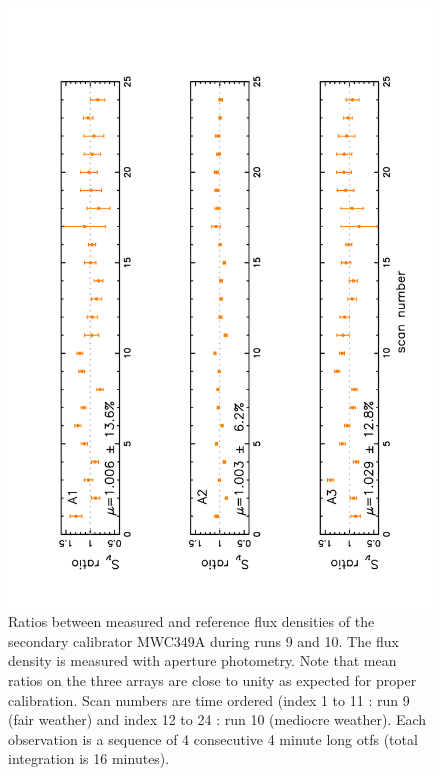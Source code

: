 \begin{figure}[p]
\begin{center}
  \includegraphics[clip, angle=-90, scale=0.6]{Figures/Ratio_vs_index_MWC349_r9_r10_Ap.pdf}
  \caption[Aperture photometry flux density stability checks on secondary calibrators]{Ratios between measured and reference flux densities of  the secondary calibrator  MWC349A
    during runs 9 and 10.  The flux density is measured with aperture photometry. Note that mean ratios
    on the three arrays are close to unity as expected for proper calibration.
    Scan numbers are time ordered (index 1 to 11 : run 9 (fair weather) and index 12 to 24 : run 10 (mediocre weather).
    Each observation is a sequence of 4 consecutive 4 minute long otfs (total integration is 16 minutes).
  }
\label{fig:ratio_349_Ap}
\end{center}
\end{figure}



